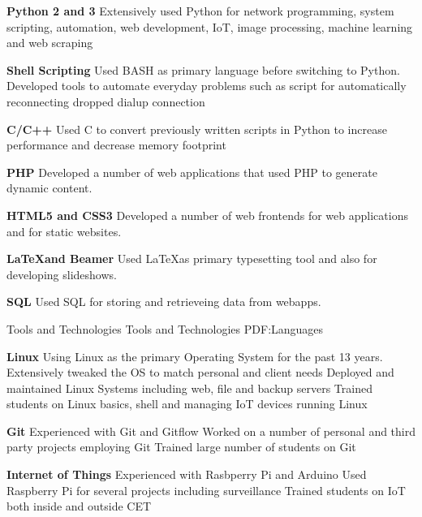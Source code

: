 \documentclass[letterpaper,MMMyyyy,nonstopmode]{simpleresumecv}
\begin{document}
\begin{Body}
\BulletItem
\textbf{Python 2 and 3}
\SubBulletItem
Extensively used Python for network programming, system scripting, automation,
web development, IoT, image processing, machine learning and web scraping

\BigGap
\BulletItem
\textbf{Shell Scripting}
\SubBulletItem
Used BASH as primary language before switching to Python. Developed tools to
automate everyday problems such as script for automatically reconnecting dropped
dialup connection

\BigGap
\BulletItem
\textbf{C/C++}
\SubBulletItem
Used C to convert previously written scripts in Python to increase performance
and decrease memory footprint

\newpage
\BulletItem
\textbf{PHP}
\SubBulletItem
Developed a number of web applications that used PHP to generate dynamic
content.

\BigGap
\BulletItem
\textbf{HTML5 and CSS3}
\SubBulletItem
Developed a number of web frontends for web applications and for static
websites.

\BigGap
\BulletItem
\textbf{\LaTeX and Beamer}
\SubBulletItem
Used \LaTeX as primary typesetting tool and also for developing slideshows.

\BigGap
\BigGap
\BulletItem
\textbf{SQL}
\SubBulletItem
Used SQL for storing and retrieveing data from webapps.


\BigGap
\Section
{Tools and Technologies}
{Tools and Technologies}
{PDF:Languages}

\BulletItem
\textbf{Linux}
\SubBulletItem
Using Linux as the primary Operating System for the past 13 years.
\SubBulletItem
Extensively tweaked the OS to match personal and client needs
\SubBulletItem
Deployed and maintained Linux Systems including web, file and backup servers
\SubBulletItem
Trained students on Linux basics, shell and managing IoT devices running Linux

\BigGap
\BulletItem
\textbf{Git}
\SubBulletItem
Experienced with Git and Gitflow
\SubBulletItem
Worked on a number of personal and third party projects employing Git
\SubBulletItem
Trained large number of students on Git

\BigGap
\BulletItem
\textbf{Internet of Things}
\SubBulletItem
Experienced with Rasbperry Pi and Arduino 
\SubBulletItem
Used Raspberry Pi for several projects including surveillance
\SubBulletItem
Trained students on IoT both inside and outside CET


\end{Body}
\end{document}
